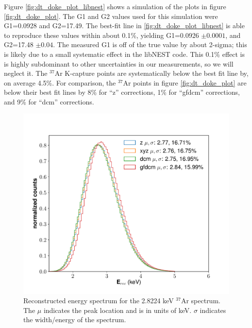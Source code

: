 {Figure \ref{fig:dt_doke_plot_libnest} shows a simulation of the plots in figure \ref{fig:dt_doke_plot}. The G1 and G2 values used for this simulation were G1=0.0928 and G2=17.49. The best-fit line in \ref{fig:dt_doke_plot_libnest} is able to reproduce these values within about 0.1\%, yielding G1=0.0926 $\pm0.0001$, and G2=17.48 $\pm0.04$. The measured G1 is off of the true value by about 2-sigma; this is likely due to a small systematic effect in the libNEST code. This 0.1\% effect is is highly subdominant to other uncertainties in our measurements, so we will neglect it. The $^{37}$Ar K-capture points are systematically below the best fit line by, on average 4.5\%. For comparison, the $^{37}$Ar points in figure \ref{fig:dt_doke_plot} are below their best fit lines by 8\% for ``z'' corrections, 1\% for ``gfdcm'' corrections, and 9\% for ``dcm'' corrections. 
\begin{figure}[h!]
\centering
  \includegraphics[width=\textwidth]{Figures/E_spec_Ar.pdf}
  \caption{Reconstructed energy spectrum for the 2.8224 keV $^{37}$Ar spectrum. The $\mu$ indicates the peak location and is in units of keV. $\sigma$ indicates the width/energy of the spectrum.}
\label{fig:E_spec_Ar} 
\end{figure}  
\begin{figure}[h!]
  \centering

\end{figure}}
